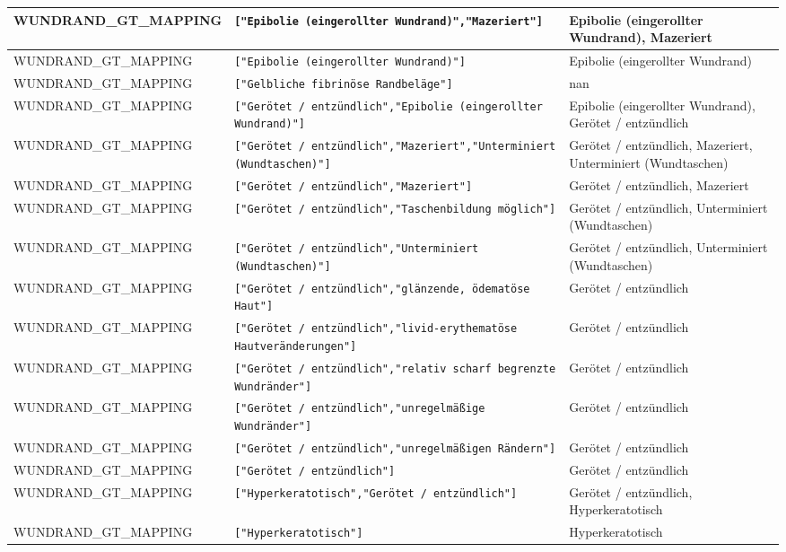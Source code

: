 \begin{longtable}{|p{3.5cm}|p{5cm}|p{6.5cm}|}
WUNDRAND\_GT\_MAPPING & \texttt{["Epibolie (eingerollter Wundrand)","Mazeriert"]} & Epibolie (eingerollter Wundrand), Mazeriert \\ \hline
WUNDRAND\_GT\_MAPPING & \texttt{["Epibolie (eingerollter Wundrand)"]} & Epibolie (eingerollter Wundrand) \\ \hline
WUNDRAND\_GT\_MAPPING & \texttt{["Gelbliche fibrinöse Randbeläge"]} & nan \\ \hline
WUNDRAND\_GT\_MAPPING & \texttt{["Gerötet / entzündlich","Epibolie (eingerollter Wundrand)"]} & Epibolie (eingerollter Wundrand), Gerötet / entzündlich \\ \hline
WUNDRAND\_GT\_MAPPING & \texttt{["Gerötet / entzündlich","Mazeriert","Unterminiert (Wundtaschen)"]} & Gerötet / entzündlich, Mazeriert, Unterminiert (Wundtaschen) \\ \hline
WUNDRAND\_GT\_MAPPING & \texttt{["Gerötet / entzündlich","Mazeriert"]} & Gerötet / entzündlich, Mazeriert \\ \hline
WUNDRAND\_GT\_MAPPING & \texttt{["Gerötet / entzündlich","Taschenbildung möglich"]} & Gerötet / entzündlich, Unterminiert (Wundtaschen) \\ \hline
WUNDRAND\_GT\_MAPPING & \texttt{["Gerötet / entzündlich","Unterminiert (Wundtaschen)"]} & Gerötet / entzündlich, Unterminiert (Wundtaschen) \\ \hline
WUNDRAND\_GT\_MAPPING & \texttt{["Gerötet / entzündlich","glänzende, ödematöse Haut"]} & Gerötet / entzündlich \\ \hline
WUNDRAND\_GT\_MAPPING & \texttt{["Gerötet / entzündlich","livid-erythematöse Hautveränderungen"]} & Gerötet / entzündlich \\ \hline
WUNDRAND\_GT\_MAPPING & \texttt{["Gerötet / entzündlich","relativ scharf begrenzte Wundränder"]} & Gerötet / entzündlich \\ \hline
WUNDRAND\_GT\_MAPPING & \texttt{["Gerötet / entzündlich","unregelmäßige Wundränder"]} & Gerötet / entzündlich \\ \hline
WUNDRAND\_GT\_MAPPING & \texttt{["Gerötet / entzündlich","unregelmäßigen Rändern"]} & Gerötet / entzündlich \\ \hline
WUNDRAND\_GT\_MAPPING & \texttt{["Gerötet / entzündlich"]} & Gerötet / entzündlich \\ \hline
WUNDRAND\_GT\_MAPPING & \texttt{["Hyperkeratotisch","Gerötet / entzündlich"]} & Gerötet / entzündlich, Hyperkeratotisch \\ \hline
WUNDRAND\_GT\_MAPPING & \texttt{["Hyperkeratotisch"]} & Hyperkeratotisch \\ \hline

\end{longtable}
